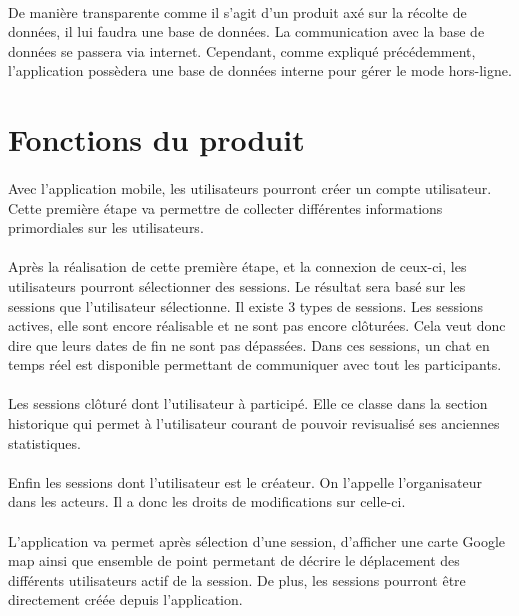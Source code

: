 \documentclass[titlepage, 12pt]{report}
\begin{document}
\paragraph{}De manière transparente comme il s'agit d'un produit axé sur la récolte de données, il lui faudra une base de données. La communication avec la base de données se passera via internet. Cependant, comme expliqué précédemment, l'application possèdera une base de données interne pour gérer le mode hors-ligne. 

\section{Fonctions du produit}

\paragraph{}Avec l'application mobile, les utilisateurs pourront créer un compte utilisateur. Cette première étape va permettre de collecter différentes informations primordiales sur les utilisateurs. 

\paragraph{}Après la réalisation de cette première étape, et la connexion de ceux-ci, les utilisateurs pourront sélectionner des sessions. Le résultat sera basé sur les sessions que l'utilisateur sélectionne. Il existe 3 types de sessions. Les sessions actives, elle sont encore réalisable et ne sont pas encore clôturées. Cela veut donc dire que leurs dates de fin ne sont pas dépassées. Dans ces sessions, un chat en temps réel est disponible permettant de communiquer avec tout les participants.
\paragraph{}Les sessions clôturé dont l'utilisateur à participé. Elle ce classe dans la section historique qui permet à l'utilisateur courant de pouvoir revisualisé ses anciennes statistiques.
\paragraph{}Enfin les sessions dont l'utilisateur est le créateur. On l'appelle l'organisateur dans les acteurs. Il a donc les droits de modifications sur celle-ci.

\paragraph{}L'application va permet après sélection d'une session, d'afficher une carte Google map ainsi que ensemble de point permetant de décrire le déplacement des différents utilisateurs actif de la session.
De plus, les sessions pourront être directement créée depuis l'application.
\end{document}
